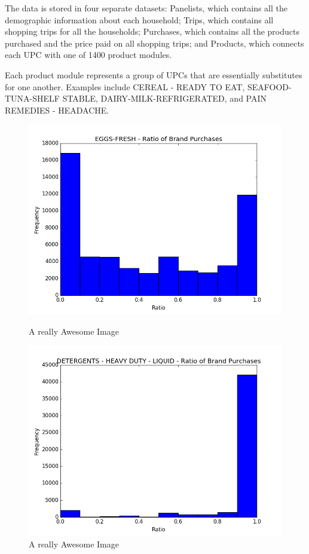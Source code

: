 \documentclass[conference]{IEEEtran}
\begin{document}
The data is stored in four separate datasets: Panelists, which contains all the demographic information about each household; Trips, which contains all shopping trips for all the households; Purchases, which contains all the products purchased and the price paid on all shopping trips; and Products, which connects each UPC with one of 1400 product modules.


Each product module represents a group of UPCs that are essentially substitutes for one another. Examples include CEREAL - READY TO EAT, SEAFOOD-TUNA-SHELF STABLE, DAIRY-MILK-REFRIGERATED, and PAIN REMEDIES - HEADACHE.

\begin{figure}[!htb]
  \includegraphics[width=\linewidth]{histogram-1}
  \caption{A really Awesome Image}\label{fig:awesome_image1}
\endminipage\hfill
{}
  \includegraphics[width=\linewidth]{histogram-2}
  \caption{A really Awesome Image}\label{fig:awesome_image2}
\endminipage\hfill
\end{figure}
\end{document}
